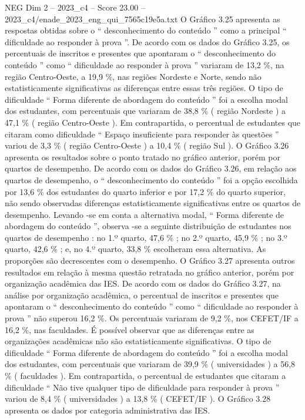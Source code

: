 \begin{textsample}{NEG Dim 2 – 2023\_c4 – Score 23.00 – 2023\_c4/enade\_2023\_eng\_qui\_7565c19e5a.txt}
O Gráfico 3.25 apresenta as respostas obtidas sobre o “ desconhecimento do conteúdo ” como a principal “ dificuldade ao responder à prova ”.
De acordo com os dados do Gráfico 3.25, os percentuais de inscritos e presentes que apontaram o “ desconhecimento do conteúdo ” como “ dificuldade ao responder à prova ” variaram de 13,2 \%, na região Centro-Oeste, a 19,9 \%, nas regiões Nordeste e Norte, sendo não estatisticamente significativas as diferenças entre essas três regiões.
O tipo de dificuldade “ Forma diferente de abordagem do conteúdo ” foi a escolha modal dos estudantes, com percentuais que variaram de 38,8 \% ( região Nordeste ) a 47,1 \% ( região Centro-Oeste ).
Em contrapartida, o percentual de estudantes que citaram como dificuldade “ Espaço insuficiente para responder às questões ” variou de 3,3 \% ( região Centro-Oeste ) a 10,4 \% ( região Sul ).
O Gráfico 3.26 apresenta os resultados sobre o ponto tratado no gráfico anterior, porém por quartos de desempenho.
De acordo com os dados do Gráfico 3.26, em relação aos quartos de desempenho, o “ desconhecimento do conteúdo ” foi a opção escolhida por 13,6 \% dos estudantes do quarto inferior e por 17,2 \% do quarto superior, não sendo observadas diferenças estatisticamente significativas entre os quartos de desempenho.
Levando -se em conta a alternativa modal, “ Forma diferente de abordagem do conteúdo ”, observa -se a seguinte distribuição de estudantes nos quartos de desempenho : no 1.º quarto, 47,6 \% ; no 2.º quarto, 45,9 \% ; no 3.º quarto, 42,6 \% ; e, no 4.º quarto, 33,8 \% escolheram essa alternativa.
As proporções são decrescentes com o desempenho.
O Gráfico 3.27 apresenta outros resultados em relação à mesma questão retratada no gráfico anterior, porém por organização acadêmica das IES.
De acordo com os dados do Gráfico 3.27, na análise por organização acadêmica, o percentual de inscritos e presentes que apontaram o “ desconhecimento do conteúdo ” como “ dificuldade ao responder à prova ” não superou 16,2 \%.
Os percentuais variaram de 9,2 \%, nos CEFET/IF a 16,2 \%, nas faculdades.
É possível observar que as diferenças entre as organizações acadêmicas não são estatisticamente significativas.
O tipo de dificuldade “ Forma diferente de abordagem do conteúdo ” foi a escolha modal dos estudantes, com percentuais que variaram de 39,9 \% ( universidades ) a 56,8 \% ( faculdades ).
Em contrapartida, o percentual de estudantes que citaram a dificuldade “ Não tive qualquer tipo de dificuldade para responder à prova ” variou de 8,4 \% ( universidades ) a 13,8 \% ( CEFET/IF ).
O Gráfico 3.28 apresenta os dados por categoria administrativa das IES.

\end{textsample}
